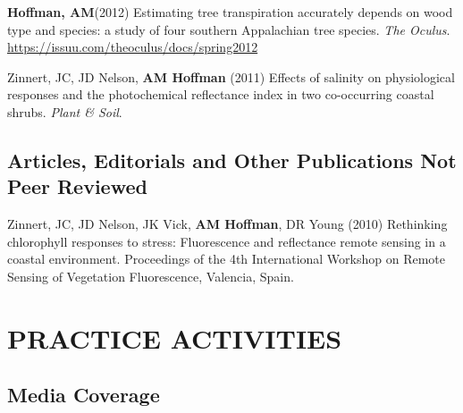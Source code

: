 \documentclass{cv}
\begin{document}
\begin{pubenum}
\sloppy %
\item\textbf{Hoffman, AM}\footnotemark[1] (2012) Estimating tree transpiration accurately depends on wood type and species: a study of four southern Appalachian tree species. \textit{The Oculus}. \href{https://issuu.com/theoculus/docs/spring2012}{https://issuu.com/theoculus/docs/spring2012}

\item Zinnert, JC, JD Nelson, \textbf{AM Hoffman} (2011) Effects of salinity on physiological responses and the photochemical reflectance index in two co-occurring coastal shrubs. \textit{Plant \& Soil}. 

\end{pubenum}

\subsection*{Articles, Editorials and Other Publications Not Peer Reviewed}



Zinnert, JC, JD Nelson, JK Vick, \textbf{AM Hoffman}, DR Young (2010) Rethinking chlorophyll responses to stress: Fluorescence and reflectance remote sensing in a coastal environment. Proceedings of the 4th International Workshop on Remote Sensing of Vegetation Fluorescence, Valencia, Spain.


\section*{PRACTICE ACTIVITIES}

\subsection*{Media Coverage}
\end{document}
